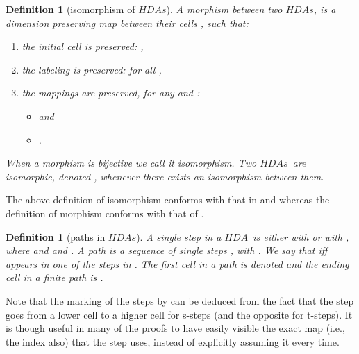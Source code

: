\documentclass[submission,copyright,creativecommons]{eptcs}
\newtheorem{definition}[theorem]{Definition}
\newcommand\HDA{\ensuremath{\mathit{HDA}}}
\newcommand\HDAs{\ensuremath{\mathit{HDAs}}}
\begin{document}
\begin{definition}[isomorphism of \HDAs]\label{def_isomorphismHDA}
A \emph{morphism} between two \HDAs,  is a dimension preserving map between their cells , such that:
\begin{enumerate}
\item\label{def_isomorphismHDA_1} the initial cell is preserved: ,
\item\label{def_isomorphismHDA_2} the labeling is preserved:  for all ,
\item\label{def_isomorphismHDA_3} the mappings are preserved, for any  and :
\begin{itemize}
\item  and
\item .
\end{itemize}
\end{enumerate}
When a morphism is bijective we call it \emph{isomorphism}. Two \HDAs\ are isomorphic, denoted , whenever there exists an isomorphism between them.
\end{definition}

The above definition of isomorphism conforms with that in \cite[Def.2]{Glabbeek06HDA} and whereas the definition of morphism conforms with that of \cite[Sec.1.1]{Goubault12Category_Cubical}.



\begin{definition}[paths in \HDAs]\label{def_paths_HDA}
A \emph{single step} in a \HDA\ is either  with  or  with , where  and  and . A \emph{path}  is a sequence of single steps , with . 
We say that  iff  appears in one of the steps in . 
The first cell in a path is denoted  and the ending cell in a finite path is . 
\end{definition}

Note that the marking of the steps by  can be deduced from the fact that the step goes from a lower cell to a higher cell for s-steps (and the opposite for t-steps). It is though useful in many of the proofs to have easily visible the exact map (i.e., the index also) that the step uses, instead of explicitly assuming it every time.
\end{document}
